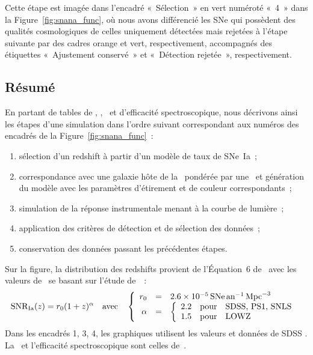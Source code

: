 \documentclass[../main/main.tex]{subfiles}
\begin{document}
Cette étape est imagée dans l'encadré «~Sélection~» en vert numéroté «~4~» dans
la Figure~\ref{fig:snana_func}, où nous avons différencié les SNe qui possèdent
des qualités cosmologiques de celles uniquement détectées
mais rejetées à l'étape suivante par des cadres orange et vert, respectivement,
accompagnés des étiquettes «~Ajustement conservé~» et «~Détection rejetée~»,
respectivement.

\subsection{Résumé}\label{ssec:simshort}

En partant de tables de \hostlib, \simlib, \wgtmap\ et d'efficacité
spectroscopique, nous décrivons ainsi les étapes d'une simulation dans l'ordre
suivant correspondant aux numéros des encadrés de la
Figure~\ref{fig:snana_func}~:
\begin{enumerate}
    \item sélection d'un redshift à partir d'un modèle de taux de SNe~Ia~;
    \item correspondance avec une galaxie hôte de la \hostlib\ pondérée par une
        \wgtmap\ et génération du modèle avec les paramètres d'étirement et de
        couleur correspondants~;
    \item simulation de la réponse instrumentale menant à la courbe de lumière~;
    \item application des critères de détection et de sélection des données~;
    \item conservation des données passant les précédentes étapes.
\end{enumerate}
Sur la figure, la distribution des redshifts provient de l'Équation~6
de~\cite{perrett2012} avec les valeurs de~\cite{popovic2021a} se basant sur
l'étude de~\cite{scolnic2018}~:
\begin{equation}
    \mathrm{SNR}_{\rm Ia}(z) = r_0(1+z)^{\alpha}\quad\text{avec}\quad \left\{
        \begin{array}{rcl}
            r_0 & = & \SI{2.6e-5}{SNe.an^{-1}.Mpc^{-3}} \\
            \alpha & = &
            \left\{
                \begin{array}{rcl}
                    \num{2.2} & \text{pour} & \text{SDSS, PS1, SNLS}\\
                    \num{1.5} & \text{pour} & \text{LOWZ}
                \end{array}
            \right.
        \end{array}
    \right.
\end{equation}
Dans les encadrés 1, 3, 4, les graphiques utilisent les valeurs et données de
SDSS \citep{sako2018}. La \wgtmap\ et l'efficacité spectroscopique sont celles
de~\cite{popovic2021a}.
\end{document}
